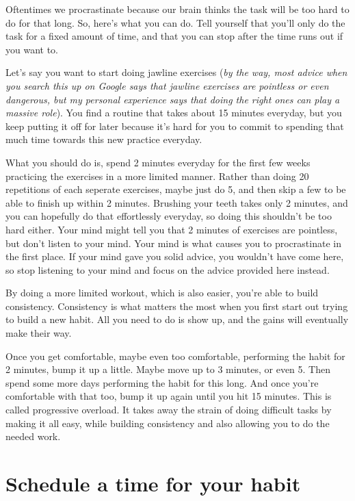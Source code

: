 \documentclass[
]{book}
\begin{document}
Oftentimes we procrastinate because our brain thinks the task will be too hard to do for that long. So, here's what you can do. Tell yourself that you'll only do the task for a fixed amount of time, and that you can stop after the time runs out if you want to.

Let's say you want to start doing jawline exercises (\emph{by the way, most advice when you search this up on Google says that jawline exercises are pointless or even dangerous, but my personal experience says that doing the right ones can play a massive role}). You find a routine that takes about 15 minutes everyday, but you keep putting it off for later because it's hard for you to commit to spending that much time towards this new practice everyday.

What you should do is, spend 2 minutes everyday for the first few weeks practicing the exercises in a more limited manner. Rather than doing 20 repetitions of each seperate exercises, maybe just do 5, and then skip a few to be able to finish up within 2 minutes. Brushing your teeth takes only 2 minutes, and you can hopefully do that effortlessly everyday, so doing this shouldn't be too hard either. Your mind might tell you that 2 minutes of exercises are pointless, but don't listen to your mind. Your mind is what causes you to procrastinate in the first place. If your mind gave you solid advice, you wouldn't have come here, so stop listening to your mind and focus on the advice provided here instead.

By doing a more limited workout, which is also easier, you're able to build consistency. Consistency is what matters the most when you first start out trying to build a new habit. All you need to do is show up, and the gains will eventually make their way.

Once you get comfortable, maybe even too comfortable, performing the habit for 2 minutes, bump it up a little. Maybe move up to 3 minutes, or even 5. Then spend some more days performing the habit for this long. And once you're comfortable with that too, bump it up again until you hit 15 minutes. This is called progressive overload. It takes away the strain of doing difficult tasks by making it all easy, while building consistency and also allowing you to do the needed work.

\hypertarget{schedule-a-time-for-your-habit}{%
\section{Schedule a time for your habit}\label{schedule-a-time-for-your-habit}}
\end{document}
